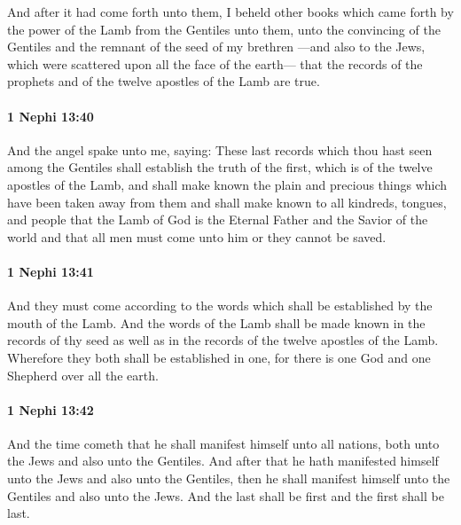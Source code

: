 			And after it had come forth unto them, I beheld other books
			which came forth by the power of the Lamb from the Gentiles unto them,
			unto the convincing of the Gentiles and the remnant of the seed of my brethren
			---and also to the Jews, which were scattered upon all the face of the earth---
			that the records of the prophets and of the twelve apostles of the Lamb are true.

		\paragraph{1 Nephi 13:40} %
			\label{1NEPHI-13-40}

			And the angel spake unto me, saying:
			These last records which thou hast seen among the Gentiles
			shall establish the truth of the first,
			which is of the twelve apostles of the Lamb,
			and shall make known the plain and precious things
			which have been taken away from them
			and shall make known to all kindreds, tongues, and people
			that the Lamb of God is the Eternal Father and the Savior of the world
			and that all men must come unto him or they cannot be saved.

		\paragraph{1 Nephi 13:41} %
			\label{1NEPHI-13-41}

			And they must come according to the words
			which shall be established by the mouth of the Lamb.
			And the words of the Lamb shall be made known in the records of thy seed
			as well as in the records of the twelve apostles of the Lamb.
			Wherefore they both shall be established in one,
			for there is one God and one Shepherd over all the earth.

		\paragraph{1 Nephi 13:42} %
			\label{1NEPHI-13-42}

			And the time cometh that he shall manifest himself unto all nations,
			both unto the Jews and also unto the Gentiles.
			And after that he hath manifested himself unto the Jews and also unto the Gentiles,
			then he shall manifest himself unto the Gentiles and also unto the Jews.
			And the last shall be first and the first shall be last.

